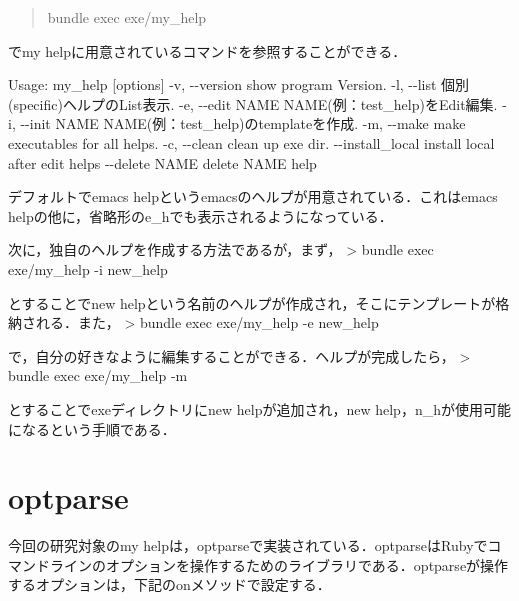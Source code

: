 \begin{quote}
bundle exec exe/my\_help
\end{quote}
でmy helpに用意されているコマンドを参照することができる．

Usage: my\_help {[}options{]} -v, -\/-version show program Version. -l,
-\/-list 個別(specific)ヘルプのList表示. -e, -\/-edit NAME
NAME(例：test\_help)をEdit編集. -i, -\/-init NAME
NAME(例：test\_help)のtemplateを作成. -m, -\/-make make executables for
all helps. -c, -\/-clean clean up exe dir. -\/-install\_local install
local after edit helps -\/-delete NAME delete NAME help

デフォルトでemacs helpというemacsのヘルプが用意されている．これはemacs
helpの他に，省略形のe\_hでも表示されるようになっている．

次に，独自のヘルプを作成する方法であるが，まず， \textgreater{} bundle
exec exe/my\_help -i new\_help

とすることでnew
helpという名前のヘルプが作成され，そこにテンプレートが格納される．また，
\textgreater{} bundle exec exe/my\_help -e new\_help

で，自分の好きなように編集することができる．ヘルプが完成したら，
\textgreater{} bundle exec exe/my\_help -m

とすることでexeディレクトリにnew helpが追加され，new
help，n\_hが使用可能になるという手順である．

\section{optparse}\label{optparse}

今回の研究対象のmy
helpは，optparseで実装されている．optparseはRubyでコマンドラインのオプションを操作するためのライブラリである．optparseが操作するオプションは，下記のonメソッドで設定する．

\begin{Shaded}
\begin{Highlighting}[]
   
\NormalTok{::}
\NormalTok{    \}}
    
\end{Highlighting}
\end{Shaded}


